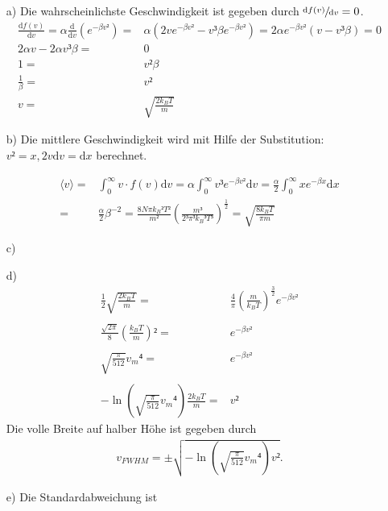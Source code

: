 \begin{itemize}
\item[a)] Die wahrscheinlichste Geschwindigkeit ist gegeben durch $\sfrac{\text{d}f(v)}{\text{d}v}=0$.
\begin{align*}
\frac{\text{d}f(v)}{\text{d}v}=\alpha\frac{\text{d}}{\text{d}v}\left(e^{-\beta v²}\right)=&\alpha\left(2ve^{-\beta v²}-v³\beta e^{-\beta v²}\right)=2\alpha e^{-\beta v²}\left(v-v³\beta\right)=0\\
2\alpha v - 2\alpha v³ \beta =& 0\\
1 =& v²\beta\\
\frac{1}{\beta}=&v²\\
v=&\sqrt{\frac{2k_BT}{m}}
\end{align*}



\item[b)] Die mittlere Geschwindigkeit wird mit Hilfe der Substitution:$ v² = x, 2v\text{d}v = \text{d}x$ berechnet. 

\begin{align*}
\langle v\rangle=&\int_{0}^\infty v\cdot f(v)\text{d}v=\alpha \int_{0}^\infty v³e^{-\beta v²}\text{d}v=\frac{\alpha}{2} \int_{0}^\infty x e^{-\beta x}\text{d}x\\
= &\frac{\alpha}{2}\beta^{-2} = \frac{8N\pi {k_B}² T²}{m²}\left(\frac{m³}{2³\pi³{k_B}³T³}\right)^{\frac{1}{2}} = \sqrt{\frac{8k_B T}{\pi m}}
\end{align*}



\item[c)]
\item[d)] 
\begin{align*}
 \frac{1}{2}\sqrt{\frac{2k_BT}{m}} =&\frac{4}{\pi}\left(\frac{m}{k_BT}\right)^\frac{3}{2}e^{-\beta v²} \\\\
\frac{\sqrt{2\pi}}{8}\left(\frac{k_BT}{m}\right)² =& e^{-\beta v²}\\\\
\sqrt{\frac{\pi}{512}}{v_m}⁴ =& e^{-\beta v²}\\\\
-\ln{\left(\sqrt{\frac{\pi}{512}}{v_m}⁴\right)}\frac{2k_BT}{m}=&v²
\end{align*}
Die volle Breite auf halber Höhe ist gegeben durch
\begin{align*}
v_{FWHM}=\pm\sqrt{-\ln{\left(\sqrt{\frac{\pi}{512}}{v_m}⁴\right)}v²}.
\end{align*}
\item[e)] Die Standardabweichung ist


\end{itemize}
